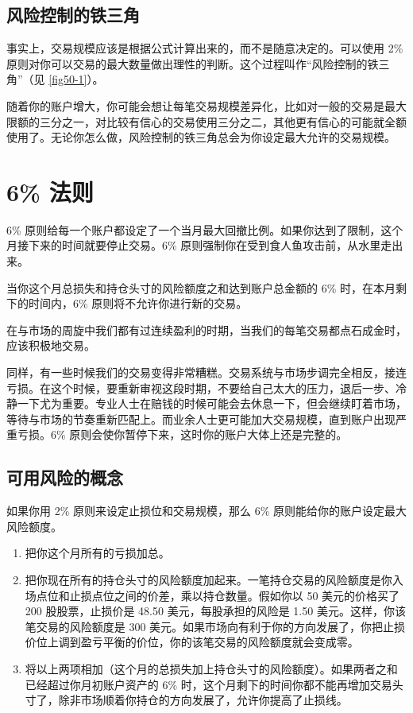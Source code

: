 \subsection*{风险控制的铁三角}
事实上，交易规模应该是根据公式计算出来的，而不是随意决定的。可以使用 2\% 原则对你可以交易的最大数量做出理性的判断。这个过程叫作“风险控制的铁三角”（见 \autoref{fig50-1}）。


随着你的账户增大，你可能会想让每笔交易规模差异化，比如对一般的交易是最大限额的三分之一，对比较有信心的交易使用三分之二，其他更有信心的可能就全额使用了。无论你怎么做，风险控制的铁三角总会为你设定最大允许的交易规模。
\section{6\% 法则}
6\% 原则给每一个账户都设定了一个当月最大回撤比例。如果你达到了限制，这个月接下来的时间就要停止交易。6\% 原则强制你在受到食人鱼攻击前，从水里走出来。

\begin{tcolorbox}
    当你这个月总损失和持仓头寸的风险额度之和达到账户总金额的 6\% 时，在本月剩下的时间内，6\% 原则将不允许你进行新的交易。
\end{tcolorbox}

在与市场的周旋中我们都有过连续盈利的时期，当我们的每笔交易都点石成金时，应该积极地交易。

同样，有一些时候我们的交易变得非常糟糕。交易系统与市场步调完全相反，接连亏损。在这个时候，要重新审视这段时期，不要给自己太大的压力，退后一步、冷静一下尤为重要。专业人士在赔钱的时候可能会去休息一下，但会继续盯着市场，等待与市场的节奏重新匹配上。而业余人士更可能加大交易规模，直到账户出现严重亏损。6\% 原则会使你暂停下来，这时你的账户大体上还是完整的。
\subsection*{可用风险的概念}
如果你用 2\% 原则来设定止损位和交易规模，那么 6\% 原则能给你的账户设定最大风险额度。
\begin{enumerate}
    \item 把你这个月所有的亏损加总。
    \item 把你现在所有的持仓头寸的风险额度加起来。一笔持仓交易的风险额度是你入场点位和止损点位之间的价差，乘以持仓数量。假如你以 50 美元的价格买了 200 股股票，止损价是 48.50 美元，每股承担的风险是 1.50 美元。这样，你该笔交易的风险额度是 300 美元。如果市场向有利于你的方向发展了，你把止损价位上调到盈亏平衡的价位，你的该笔交易的风险额度就会变成零。
    \item 将以上两项相加（这个月的总损失加上持仓头寸的风险额度）。如果两者之和已经超过你月初账户资产的 6\% 时，这个月剩下的时间你都不能再增加交易头寸了，除非市场顺着你持仓的方向发展了，允许你提高了止损线。
\end{enumerate}


